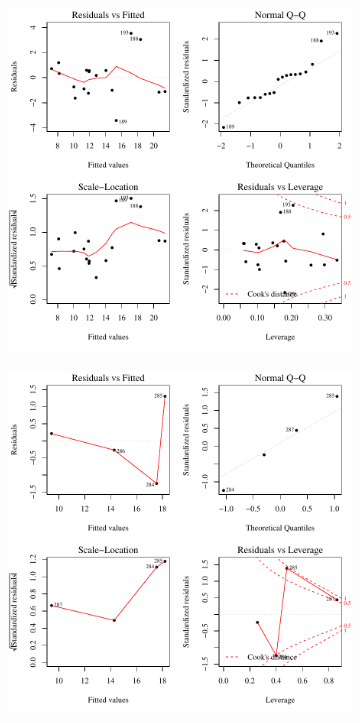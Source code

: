 \begin{linenumbers}
\subfiguremid
\begin{landscape}
	\begin{figure}
		\begin{subfigure}{0.7\textwidth}
			\centering
			\includegraphics[width=\tableCustomSize]{"Figures/Results_USR/Stochastic/Conc Model lm-fit TIM"}
		\end{subfigure}%
		\begin{subfigure}{0.7\textwidth}
			\centering
			\includegraphics[width=\tableCustomSize]{"Figures/Results_USR/Stochastic/Conc Model lm-fit HRC"}

\end{subfigure}
\end{figure}
\end{landscape}
\end{linenumbers}
